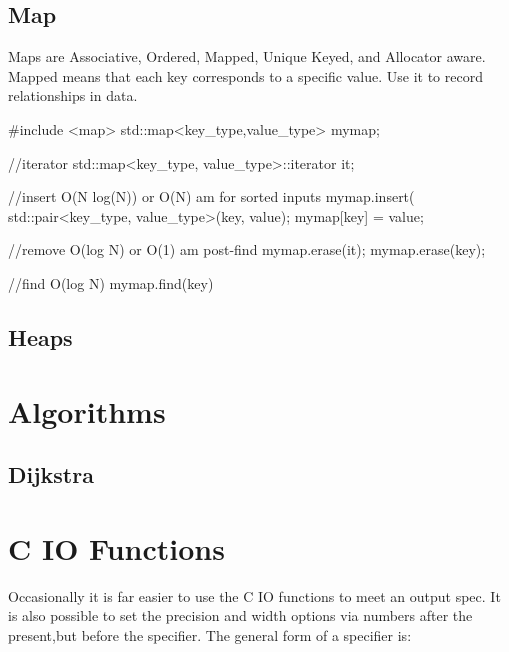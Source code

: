 \documentclass[letterpaper, 10pt]{report}
\begin{document}
\section{Map}
Maps are Associative, Ordered, Mapped, Unique Keyed, and Allocator aware\cite{cplusplus}.  Mapped means that each key corresponds to a specific value. Use it to record relationships in data.
\begin{code}
    #include <map>
    std::map<key_type,value_type> mymap;

    //iterator
    std::map<key_type, value_type>::iterator it;

    //insert O(N log(N)) or O(N) am for sorted inputs
    mymap.insert( std::pair<key_type, value_type>(key, value);
    mymap[key] = value;

    //remove O(log N) or O(1) am post-find
    mymap.erase(it);
    mymap.erase(key);

    //find O(log N)
    mymap.find(key)
\end{code}
\section{Heaps}


\chapter{Algorithms}
\section{Dijkstra}

\chapter{C IO Functions}
Occasionally it is far easier to use the C IO functions to meet an output spec. It is also possible to set the precision and width options via numbers after the present,but before the specifier.  The general form of a specifier is: 

\begin{code}
\end{code}
\end{document}
